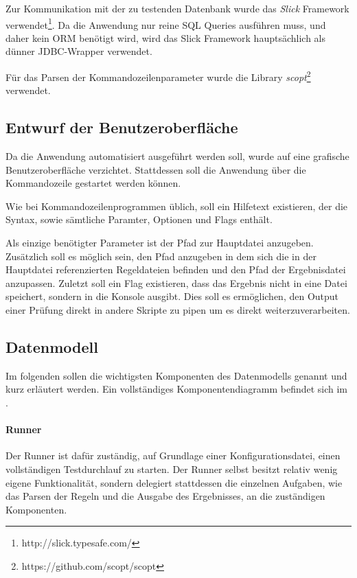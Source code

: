 Zur Kommunikation mit der zu testenden Datenbank wurde das \textit{Slick} Framework verwendet\footnote{http://slick.typesafe.com/}. Da die Anwendung nur reine \acs{SQL} Queries ausführen muss, und daher kein \ac{ORM} benötigt wird, wird das Slick Framework hauptsächlich als dünner \ac{JDBC}-Wrapper verwendet.

Für das Parsen der Kommandozeilenparameter wurde die Library \textit{scopt}\footnote{https://github.com/scopt/scopt} verwendet. 


\subsection{Entwurf der Benutzeroberfläche}
\label{sec:Benutzeroberflaeche} 

Da die Anwendung automatisiert ausgeführt werden soll, wurde auf eine grafische Benutzeroberfläche verzichtet. Stattdessen soll die Anwendung über die Kommandozeile gestartet werden können. 

Wie bei Kommandozeilenprogrammen üblich, soll ein Hilfetext existieren, der die Syntax, sowie sämtliche Paramter, Optionen und Flags enthält.

Als einzige benötigter Parameter ist der Pfad zur Hauptdatei anzugeben. Zusätzlich soll es möglich sein, den Pfad anzugeben in dem sich die in der Hauptdatei referenzierten Regeldateien befinden und den Pfad der Ergebnisdatei anzupassen. Zuletzt soll ein Flag existieren, dass das Ergebnis nicht in eine Datei speichert, sondern in die Konsole ausgibt. Dies soll es ermöglichen, den Output einer Prüfung direkt in andere Skripte zu pipen um es \zB direkt weiterzuverarbeiten.


\subsection{Datenmodell}
\label{sec:Datenmodell}

Im folgenden sollen die wichtigsten Komponenten des Datenmodells genannt und kurz erläutert werden. Ein vollständiges Komponentendiagramm befindet sich im .

\paragraph{Runner}
Der Runner ist dafür zuständig, auf Grundlage einer Konfigurationsdatei, einen vollständigen Testdurchlauf zu starten. Der Runner selbst besitzt relativ wenig eigene Funktionalität, sondern delegiert stattdessen die einzelnen Aufgaben, wie \zB das Parsen der Regeln und die Ausgabe des Ergebnisses, an die zuständigen Komponenten.

